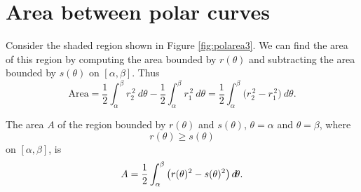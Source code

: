 \documentclass{ximera}
\begin{document}


\section{Area between polar curves}

Consider the shaded region shown in Figure \ref{fig:polarea3}. We can
find the area of this region by computing the area bounded by
$r(\theta)$ and subtracting the area bounded by $s(\theta)$ on
$[\alpha,\beta]$. Thus
\[
\text{Area} = \frac12\int_\alpha^\beta r_2^{\,2}\ d\theta -
\frac12\int_\alpha^\beta r_1^{\,2}\ d\theta = \frac12\int_\alpha^\beta
\big(r_2^{\,2}-r_1^{\,2}\big)\ d\theta.
\]


\begin{theorem}
The area $A$ of the region bounded by $r(\theta)$ and $s(\theta)$,
$\theta=\alpha$ and $\theta=\beta$, where
\[
r(\theta)\ge s(\theta)
\]
on $[\alpha,\beta]$, is
\[
A = \frac12\int_\alpha^\beta \big(r(\theta)^2-s(\theta)^2\big)\mathop{}\!d\! \theta.
\]
\end{theorem}
\end{document}
